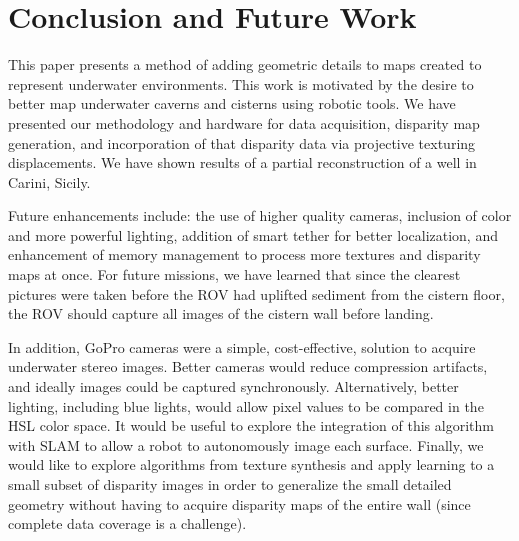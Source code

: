\documentclass{llncs}
\begin{document}
\section{Conclusion and Future Work}
\label{sec:conclusion}
\noindent This paper presents a method of adding geometric details to maps created to represent underwater environments. 
This work is motivated by the desire to better map underwater caverns and cisterns using robotic tools.  We have presented our methodology and hardware for data acquisition, disparity map generation, and incorporation of that disparity data via projective texturing displacements.  We have shown results of a partial reconstruction of a well in Carini, Sicily.

Future enhancements include: the use of higher quality cameras, inclusion of color and more powerful lighting, addition of smart tether for better localization, and enhancement of memory management to process more textures and disparity maps at once.
For future missions, we have learned that since the clearest pictures were taken before the ROV had uplifted sediment from the cistern floor, the ROV should capture all images of the cistern wall before landing. 

In addition, GoPro cameras were a simple, cost-effective, solution to acquire underwater stereo images.
Better cameras would reduce compression artifacts, and ideally images could be captured synchronously.
Alternatively, better lighting, including blue lights, would allow pixel values to be compared in the HSL color space.
It would be useful to explore the integration of this algorithm with SLAM to allow a robot to autonomously image each surface. Finally, we would like to explore algorithms from texture synthesis and apply learning to a small subset of disparity images in order to generalize the small detailed geometry without having to acquire disparity maps of the entire wall (since complete data coverage is a challenge).


\end{document}
